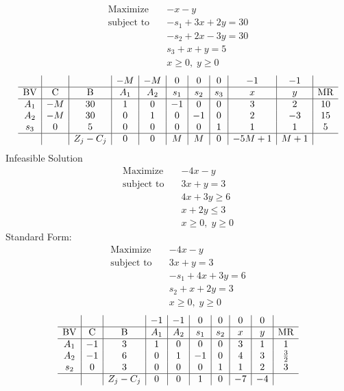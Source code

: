 \documentclass{article}
\begin{document}
\begin{align*}
\text{Maximize} \quad & -x - y\\
\text{subject to} \quad
& -s_{1} + 3x + 2y=30\\
& -s_{2} + 2x - 3y=30\\
& s_{3} + x + y=5\\
& x\ge0,\; y\ge0\end{align*}
\begin{align*}
\begin{array}{c|c|c|c|c|c|c|c|c|c|c}
 &  &  & -M & -M & 0 & 0 & 0 & -1 & -1 & \\
\hline
\text{BV} & \text{C} & \text{B} & A_{1} & A_{2} & s_{1} & s_{2} & s_{3} & x & y & \text{MR} \\
\hline
A_{1} & -M & 30 & 1 & 0 & -1 & 0 & 0 & 3 & 2 & 10 \\
A_{2} & -M & 30 & 0 & 1 & 0 & -1 & 0 & 2 & -3 & 15 \\
s_{3} & 0 & 5 & 0 & 0 & 0 & 0 & 1 & 1 & 1 & 5 \\
\hline
 &  & Z_j-C_j & 0 & 0 & M & M & 0 & -5M + 1 & M + 1 & \\
\end{array}
\end{align*}
Infeasible Solution\\
\begin{align*}
\text{Maximize} \quad & -4x - y\\
\text{subject to} \quad
& 3x + y=3\\
& 4x + 3y\ge6\\
& x + 2y\le3\\
& x\ge0,\; y\ge0\end{align*}
Standard Form:\\
\begin{align*}
\text{Maximize} \quad & -4x - y\\
\text{subject to} \quad
& 3x + y=3\\
& -s_{1} + 4x + 3y=6\\
& s_{2} + x + 2y=3\\
& x\ge0,\; y\ge0\end{align*}
\begin{align*}
\begin{array}{c|c|c|c|c|c|c|c|c|c}
 &  &  & -1 & -1 & 0 & 0 & 0 & 0 & \\
\hline
\text{BV} & \text{C} & \text{B} & A_{1} & A_{2} & s_{1} & s_{2} & x & y & \text{MR} \\
\hline
A_{1} & -1 & 3 & 1 & 0 & 0 & 0 & 3 & 1 & 1 \\
A_{2} & -1 & 6 & 0 & 1 & -1 & 0 & 4 & 3 & \frac{3}{2} \\
s_{2} & 0 & 3 & 0 & 0 & 0 & 1 & 1 & 2 & 3 \\
\hline
 &  & Z_j-C_j & 0 & 0 & 1 & 0 & -7 & -4 & \\
\end{array}
\end{align*}
\end{document}
